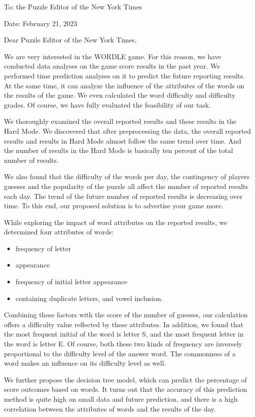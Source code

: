 \documentclass{mcmthesis}
\begin{document}
\noindent To: the Puzzle Editor of the New York Times

\noindent Date: February 21, 2023

\noindent Dear Puzzle Editor of the New York Times,

We are very interested in the WORDLE game. For this reason, we have conducted data analyses on the game score results in the past year. We performed time prediction analyses on it to predict the future reporting results. At the same time, it can analyze the influence of the attributes of the words on the results of the game. We even calculated the word difficulty and difficulty grades. Of course, we have fully evaluated the feasibility of our task.

We thoroughly examined the overall reported results and these results in the Hard Mode. We discovered that after preprocessing the data, the overall reported results and  results in Hard Mode almost follow the same trend over time. And the number of results in the Hard Mode is basically ten percent of the total number of results.

We also found that the difficulty of the words per day, the contingency of players guesses and the popularity of the puzzle all affect the number of  reported results each day. The trend of the future number of reported results is decreasing over time. To this end, our proposed solution is to advertise your game more.

While exploring the impact of word attributes on the reported results, we determined four attributes of words: 
\begin{itemize}
    \item frequency of letter
    \item appearance
    \item frequency of initial letter appearance
    \item containing duplicate letters, and vowel inclusion.
\end{itemize}
Combining these factors with the score of the number of guesses, our calculation offers a difficulty value reflected by these attributes. In addition, we found that the most frequent initial of the word is letter S, and the most frequent letter in the word is letter E. Of course, both these two kinds of frequency  are inversely proportional to the difficulty level of the answer word. The commonness of a word makes an influence on its difficulty level as well.

We further propose the decision tree model, which can predict the percentage of score outcomes based on words. It turns out that the accuracy of this prediction method is quite high on small data and future prediction, and there is a high correlation between the attributes of words and the results of the day.
\end{document}
